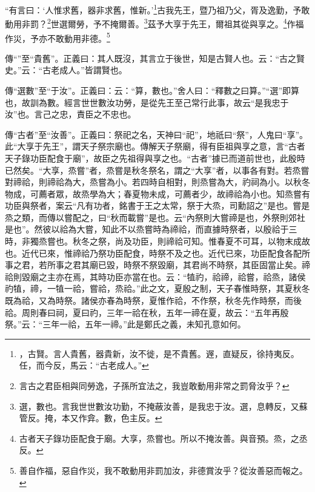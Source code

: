 “有言曰：‘人惟求舊，器非求舊，惟新。’\footnote{，古賢。言人貴舊，器貴新，汝不徙，是不貴舊。遟，直疑反，徐持夷反。任，而今反，馬云：“古老成人。”}古我先王，暨乃祖乃父，胥及逸勤，予敢動用非罰？\footnote{言古之君臣相與同勞逸，子孫所宜法之，我豈敢動用非常之罰脅汝乎？}世選爾勞，予不掩爾善。\footnote{選，數也。言我世世數汝功勤，不掩蔽汝善，是我忠于汝。選，息轉反，又蘇管反。掩，本又作弇。數，色主反。}茲予大享于先王，爾祖其從與享之。\footnote{古者天子錄功臣配食于廟。大享，烝嘗也。所以不掩汝善。與音預。烝，之丞反。}作福作災，予亦不敢動用非德。\footnote{善自作福，惡自作災，我不敢動用非罰加汝，非德賞汝乎？從汝善惡而報之。}

{\noindent\zhuan{}\fzbyks 傳“”至“貴舊”。正義曰：其人既沒，其言立于後世，知是古賢人也。云：“古之賢史。”云：“古老成人。”皆謂賢也。 \par}

{\noindent\zhuan{}\fzbyks 傳“選數”至“于汝”。正義曰：云：“算，數也。”舍人曰：“釋數之曰算。”“選”即算也，故訓為數。經言世世數汝功勞，是從先王至己常行此事，故云“是我忠于汝”也。言己之忠，責臣之不忠也。 \par}

{\noindent\zhuan{}\fzbyks 傳“古者”至“汝善”。正義曰：祭祀之名，天神曰“祀”，地祇曰“祭”，人鬼曰“享”。此“大享于先王”，謂天子祭宗廟也。傳解天子祭廟，得有臣祖與享之意，言“古者天子錄功臣配食于廟”，故臣之先祖得與享之也。“古者”據已而道前世也，此殷時已然矣。“大享，烝嘗”者，烝嘗是秋冬祭名，謂之“大享”者，以事各有對。若烝嘗對禘祫，則禘祫為大，烝嘗為小。若四時自相對，則烝嘗為大，礿祠為小。以秋冬物成，可薦者眾，故烝學為大；春夏物未成，可薦者少，故禘祫為小也。知烝嘗有功臣與祭者，案云“凡有功者，銘書于王之太常，祭于大烝，司勳詔之”是也。嘗是烝之類，而傳以嘗配之，曰“秋而載嘗”是也。云“內祭則大嘗禘是也，外祭則郊社是也”。然彼以祫為大嘗，知此不以烝嘗時為禘祫，而直據時祭者，以殷祫于三時，非獨烝嘗也。秋冬之祭，尚及功臣，則禘祫可知。惟春夏不可耳，以物末成故也。近代已來，惟禘祫乃祭功臣配食，時祭不及之也。近代已來，功臣配食各配所事之君，若所事之君其廟已毀，時祭不祭毀廟，其君尚不時祭，其臣固當止矣。禘祫則毀廟之主亦在焉，其時功臣亦當在也。云：“犆礿，祫禘，祫嘗，祫烝，諸侯礿犆，禘，一犆一祫，嘗祫，烝祫。”此之文，夏殷之制，天子春惟時祭，其夏秋冬既為祫，又為時祭。諸侯亦春為時祭，夏惟作祫，不作祭，秋冬先作時祭，而後祫。周則春曰祠，夏曰礿，三年一祫在秋，五年一禘在夏，故云：“五年再殷祭。”云：“三年一祫，五年一禘。”此是鄭氏之義，未知孔意如何。 \par}

